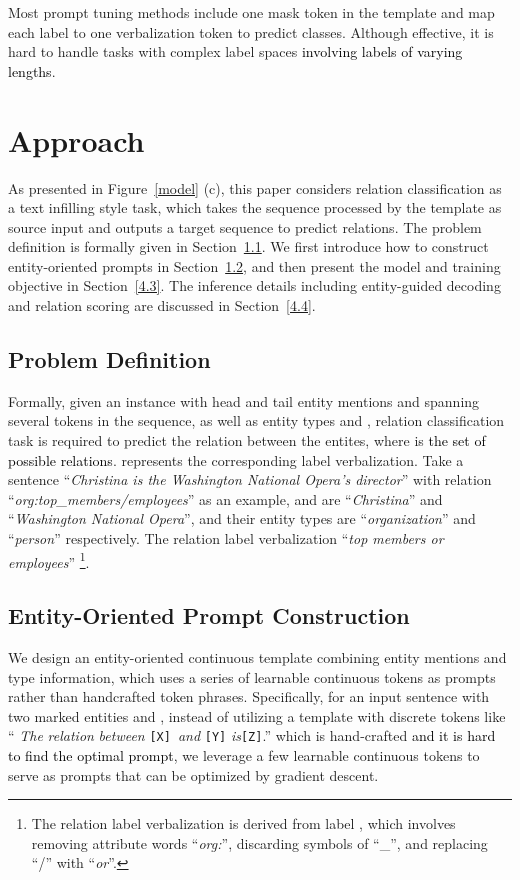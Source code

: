 \documentclass[11pt]{article}
\begin{document}
Most prompt tuning methods include one mask token in the template and map each label to one verbalization token to predict classes. Although effective, it is hard to handle tasks with complex label spaces \textcolor{black}{involving labels of varying lengths}.

\section{Approach}\label{4}
As presented in Figure~\ref{model} (c), this paper considers relation classification as a text infilling style task, which takes the sequence  processed by the template as source input and outputs a target sequence  to predict relations. The problem definition is formally given in Section~\ref{4.1}. We first introduce how to construct entity-oriented prompts in Section~\ref{4.2}, and then present the model and training objective in Section~\ref{4.3}. The inference details including entity-guided decoding and relation scoring are discussed in Section~\ref{4.4}.

\subsection{Problem Definition}\label{4.1}

Formally, given an instance  with head and tail entity mentions  and  spanning several tokens in the sequence, as well as entity types  and , relation classification task is required to predict the relation  between the entites, where  is \textcolor{black}{the set of possible relations}.  represents the corresponding label verbalization.
Take a sentence  ``\textit{Christina is the Washington National Opera's director}'' with relation  ``\textit{org:top\_members/employees}'' as an example,  and  are ``\textit{Christina}'' and ``\textit{Washington National Opera}'', and their entity types are ``\textit{organization}'' and ``\textit{person}'' respectively. The relation label verbalization  ``\textit{top members or employees}'' \footnote{The relation label verbalization  is derived from label , which involves removing attribute words ``\textit{org:}'', discarding symbols of “\_”, and replacing ``/'' with ``\textit{or}''.}. 

\subsection{Entity-Oriented Prompt Construction}\label{4.2}
We design an entity-oriented continuous template  combining entity mentions and type information, which uses a series of learnable continuous tokens \cite{DBLP:journals/corr/abs-2103-10385} as prompts rather than handcrafted token phrases. Specifically, for an input sentence  with two marked entities  and , instead of utilizing a template with discrete tokens like `` \textit{The} \textit{relation} \textit{between} \texttt{[X]} \,\;\textit{and}\;  \texttt{[Y]}\;  \;\textit{is}\;\texttt{[Z]}.'' which is hand-crafted \textcolor{black}{and it is hard to find the optimal prompt}, we leverage a few learnable continuous tokens to serve as prompts that can be optimized by gradient descent.
\end{document}
